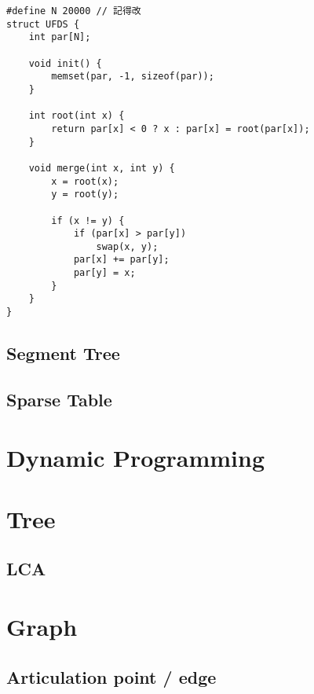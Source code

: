 \documentclass[10pt,oneside]{article}
\begin{document}
\begin{landscape}
\begin{multicols}{2}
\begin{lstlisting}
#define N 20000 // 記得改
struct UFDS {
    int par[N];

    void init() {
        memset(par, -1, sizeof(par));
    }

    int root(int x) {
        return par[x] < 0 ? x : par[x] = root(par[x]);
    }

    void merge(int x, int y) {
        x = root(x);
        y = root(y);

        if (x != y) {
            if (par[x] > par[y])
                swap(x, y);
            par[x] += par[y];
            par[y] = x;
        }
    }
}
\end{lstlisting}

\subsection{Segment Tree}

\subsection{Sparse Table}



\section{Dynamic Programming}


\section{Tree}

\subsection{LCA}


\section{Graph}

\subsection{Articulation point / edge}


\end{multicols}
\end{landscape}
\end{document}

